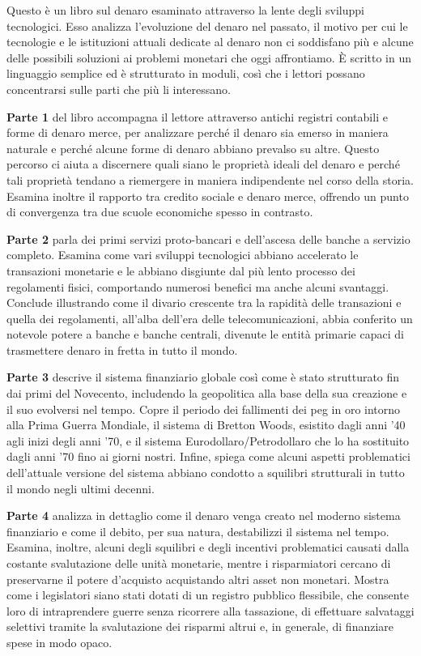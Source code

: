 \documentclass[
  a5paper,
  smalldemyvopaper,10pt,twoside,onecolumn,openright,extrafontsizes,hidelinks]{memoir}
\begin{document}
Questo è un libro sul denaro esaminato attraverso la lente degli
sviluppi tecnologici. Esso analizza l'evoluzione del denaro nel passato,
il motivo per cui le tecnologie e le istituzioni attuali dedicate al
denaro non ci soddisfano più e alcune delle possibili soluzioni ai
problemi monetari che oggi affrontiamo. È scritto in un linguaggio
semplice ed è strutturato in moduli, così che i lettori possano
concentrarsi sulle parti che più li interessano.

\textbf{Parte 1} del libro accompagna il lettore attraverso antichi
registri contabili e forme di denaro merce, per analizzare perché il
denaro sia emerso in maniera naturale e perché alcune forme di denaro
abbiano prevalso su altre. Questo percorso ci aiuta a discernere quali
siano le proprietà ideali del denaro e perché tali proprietà tendano a
riemergere in maniera indipendente nel corso della storia. Esamina
inoltre il rapporto tra credito sociale e denaro merce, offrendo un
punto di convergenza tra due scuole economiche spesso in contrasto.

\textbf{Parte 2} parla dei primi servizi proto-bancari e dell'ascesa
delle banche a servizio completo. Esamina come vari sviluppi tecnologici
abbiano accelerato le transazioni monetarie e le abbiano disgiunte dal
più lento processo dei regolamenti fisici, comportando numerosi benefici
ma anche alcuni svantaggi. Conclude illustrando come il divario
crescente tra la rapidità delle transazioni e quella dei regolamenti,
all'alba dell'era delle telecomunicazioni, abbia conferito un notevole
potere a banche e banche centrali, divenute le entità primarie capaci di
trasmettere denaro in fretta in tutto il mondo.

\textbf{Parte 3} descrive il sistema finanziario globale così come è
stato strutturato fin dai primi del Novecento, includendo la geopolitica
alla base della sua creazione e il suo evolversi nel tempo. Copre il
periodo dei fallimenti dei peg in oro intorno alla Prima Guerra
Mondiale, il sistema di Bretton Woods, esistito dagli anni '40 agli
inizi degli anni '70, e il sistema Eurodollaro/Petrodollaro che lo ha
sostituito dagli anni '70 fino ai giorni nostri. Infine, spiega come
alcuni aspetti problematici dell'attuale versione del sistema abbiano
condotto a squilibri strutturali in tutto il mondo negli ultimi decenni.

\textbf{Parte 4} analizza in dettaglio come il denaro venga creato nel
moderno sistema finanziario e come il debito, per sua natura,
destabilizzi il sistema nel tempo. Esamina, inoltre, alcuni degli
squilibri e degli incentivi problematici causati dalla costante
svalutazione delle unità monetarie, mentre i risparmiatori cercano di
preservarne il potere d'acquisto acquistando altri asset non monetari.
Mostra come i legislatori siano stati dotati di un registro pubblico
flessibile, che consente loro di intraprendere guerre senza ricorrere
alla tassazione, di effettuare salvataggi selettivi tramite la
svalutazione dei risparmi altrui e, in generale, di finanziare spese in
modo opaco.
\end{document}
